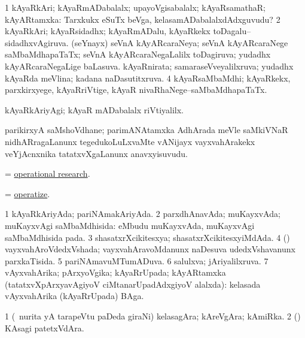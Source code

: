 \bentry
{}
\gl{\gu}
\bmng
\bnum
\num{1} kAyaRkAri; kAyaRmADabalalx; upayoVgisabalalx; kAyaRsamathaR; kAyARtamxka:  Tarxkukx eSuTx beVga, kelasamADabalalxdAdxguvudu? 
\num{2} kAyaRkAri; kAyaRsidadhx; kAyaRmADalu, kAyaRkekx toDagalu--sidadhxvAgiruva. 
 (seYnayx) 
\banum
{} seVnA kAyARcaraNeya; seVnA kAyARcaraNege saMbaMdhapaTaTx; seVnA kAyARcaraNegaLalilx toDagiruva; yudadhx kAyARcaraNegaLige baLasuva. 
 kAyaRnirata; samaraseVveyalilxruva; yudadhx kAyaRda meVlina; kadana naDasutitxruva. 
\eanum
\numie
\num{4} kAyaRsaMbaMdhi; kAyaRkekx, parxkirxyege, kAyaRriVtige, kAyaR nivaRhaNege--saMbaMdhapaTaTx. 
\enum
\emng
\eentry

\bentry
{}
\gl{\kirxvi}
\bmng
kAyaRkAriyAgi; kAyaR mADabalalx riVtiyalilx. 
\emng
\eentry

\bentry
{}
\gl{\nA}
\bmng
parikirxyA saMshoVdhane; parimANAtamxka AdhArada meVle saMkiVNaR nidhARragaLanunx tegedukoLuLxvaMte vANijayx vayxvahArakekx veYjAcnxnika tatatxvXgaLanunx anavxyisuvudu. 
\emng
\eentry

\bentry
{}
\gl{\nA}
\bmng
= \hyperlink{operational research}{operational research}. 
\emng
\eentry

\bentry
{}
\gl{\sakirx}
\bmng
= \hyperlink{operatize}{operatize}. 
\emng
\eentry

\bentry
{}
\gl{\gu}
\bmng
\bnum
\num{1} kAyaRkAriyAda; pariNAmakAriyAda. 
\num{2} parxdhAnavAda; muKayxvAda; muKayxvAgi saMbaMdhisida:  eMbudu muKayxvAda, muKayxvAgi saMbaMdhisida pada. 
\num{3} shasatxrXcikitesxya; shasatxrXcikitesxyiMdAda. 
\num{4} (\nAyxshA) vayxvahAroVdedxVshada; vayxvahAravoMdanunx naDesuva udedxVshavanunx parxkaTisida. 
\num{5} pariNAmavuMTumADuva. 
\num{6} salulxva; jAriyalilxruva. 
\num{7} vAyxvahArika; pArxyoVgika; kAyaRrUpada; kAyARtamxka (tatatxvXpArxyavAgiyoV ciMtanarUpadAdxgiyoV alalxda):  kelasada vAyxvahArika (kAyaRrUpada) BAga. 
\enum
\emng
\eentry

\bentry
{}
\gl{\nA}
\bmng
\bnum
\num{1} (\kanmu\ nurita yA tarapeVtu paDeda giraNi) kelasagAra; kAreVgAra; kAmiRka. 
\num{2} (\ame) KAsagi patetxVdAra. 
\enum
\emng
\eentry

